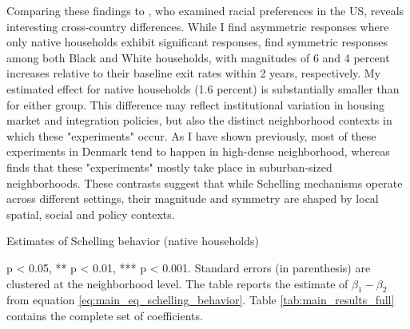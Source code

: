 \documentclass[../main.tex]{subfiles}
\begin{document}
Comparing these findings to \textcite{Bayer_2022_nearest_neighbor}, who examined racial preferences in the US, reveals interesting cross-country differences. While I find asymmetric responses where only native households exhibit significant responses, \textcite{Bayer_2022_nearest_neighbor} find symmetric responses among both Black and White households, with magnitudes of 6 and 4 percent increases relative to their baseline exit rates within 2 years, respectively. My estimated effect for native households (1.6 percent) is substantially smaller than for either group. This difference may reflect institutional variation in housing market and integration policies, but also the distinct neighborhood contexts in which these "experiments" occur. As I have shown previously, most of these experiments in Denmark tend to happen in high-dense neighborhood, whereas \textcite{Bayer_2022_nearest_neighbor} finds that these "experiments" mostly take place in suburban-sized neighborhoods. These contrasts suggest that while Schelling mechanisms operate across different settings, their magnitude and symmetry are shaped by local spatial, social and policy contexts. 



\begin{table}[H]
    \caption{Estimates of Schelling behavior (native households)}
    \label{tab:main_results_native}
    \begin{adjustbox}{width = \linewidth, center}
        
    \begin{threeparttable}
            
    \begin{tablenotes}[flushleft]
    \item \scriptsize * p < 0.05, ** p < 0.01, *** p < 0.001. Standard errors (in parenthesis) are clustered at the neighborhood level. The table reports the estimate of $\beta_1 - \beta_2$ from equation \ref{eq:main_eq_schelling_behavior}. Table \ref{tab:main_results_full} contains the complete set of coefficients.
    \end{tablenotes}
    \end{threeparttable}
    \end{adjustbox}
\end{table}
\end{document}
